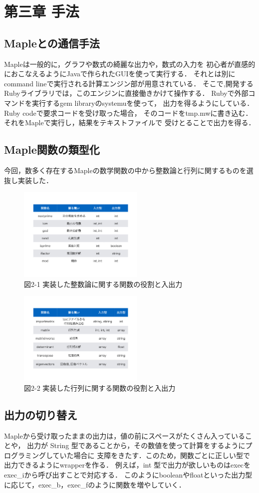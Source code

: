 \section{第三章 手法}
\subsection{Mapleとの通信手法}
Mapleは一般的に，グラフや数式の綺麗な出力や，数式の入力を
初心者が直感的におこなえるようにJavaで作られたGUIを使って実行する．
それとは別にcommand lineで実行される計算エンジン部が用意されている．
そこで,開発するRubyライブラリでは，このエンジンに直接働きかけて操作する．
Rubyで外部コマンドを実行するgem libraryのsystemuを使って，
出力を得るようにしている．Ruby codeで要求コードを受け取った場合，
そのコードをtmp.mwに書き込む．それをMapleで実行し，結果をテキストファイルで
受けとることで出力を得る．

\subsection{Maple関数の類型化}
今回，数多く存在するMapleの数学関数の中から整数論と行列に関するものを選抜し実装した．

\begin{figure}[htbp]\begin{center}
\includegraphics[width=6cm,bb=0 0 442 500]{../figs/./mapleruby_eringi.001.png}
\caption{図2-1 実装した整数論に関する関数の役割と入出力}
\label{default}\end{center}\end{figure}
\begin{figure}[htbp]\begin{center}
\includegraphics[width=6cm,bb=0 0 442 500]{../figs/./mapleruby_eringi.002.png}
\caption{図2-2 実装した行列に関する関数の役割と入出力}
\label{default}\end{center}\end{figure}
\subsection{出力の切り替え}
Mapleから受け取ったままの出力は，値の前にスペースがたくさん入っていることや，
出力が String 型であることから，その数値を使って計算をするようにプログラミングしていた場合に
支障をきたす．このため，関数ごとに正しい型で出力できるようにwrapperを作る．
例えば，int 型で出力が欲しいものはexecをexec\_iから呼び出すことで対応する．
このようにbooleanやfloatといった出力型に応じて，exec\_b，exec\_fのように関数を増やしていく．

